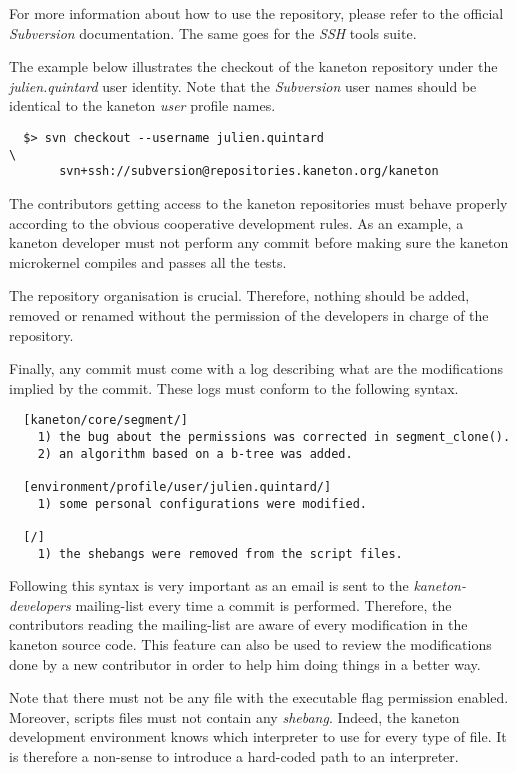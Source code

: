 For more information about how to use the repository, please refer to the
official \textit{Subversion} documentation. The same goes for the
\textit{SSH} tools suite.

The example below illustrates the checkout of the kaneton repository
under the \textit{julien.quintard} user identity. Note that the
\textit{Subversion} user names should be identical to the kaneton \textit{user}
profile names.

\begin{verbatim}
  $> svn checkout --username julien.quintard                            \
       svn+ssh://subversion@repositories.kaneton.org/kaneton
\end{verbatim}

The contributors getting access to the kaneton repositories must behave
properly according to the obvious cooperative development rules. As an
example, a kaneton developer must not perform any commit before making sure
the kaneton microkernel compiles and passes all the tests.

The repository organisation is crucial. Therefore, nothing should be
added, removed or renamed without the permission of the developers in charge
of the repository.

Finally, any commit must come with a log describing what are the modifications
implied by the commit. These logs must conform to the following syntax.

\begin{verbatim}
  [kaneton/core/segment/]
    1) the bug about the permissions was corrected in segment_clone().
    2) an algorithm based on a b-tree was added.

  [environment/profile/user/julien.quintard/]
    1) some personal configurations were modified.

  [/]
    1) the shebangs were removed from the script files.
\end{verbatim}

Following this syntax is very important as an email is sent to the
\textit{kaneton-developers} mailing-list every time a commit is performed.
Therefore, the contributors reading the mailing-list are aware of every
modification in the kaneton source code. This feature can also be used
to review the modifications done by a new contributor in order to help
him doing things in a better way.

Note that there must not be any file with the executable flag permission
enabled. Moreover, scripts files must not contain any \textit{shebang}.
Indeed, the kaneton development environment knows which interpreter to
use for every type of file. It is therefore a non-sense to introduce a
hard-coded path to an interpreter.
